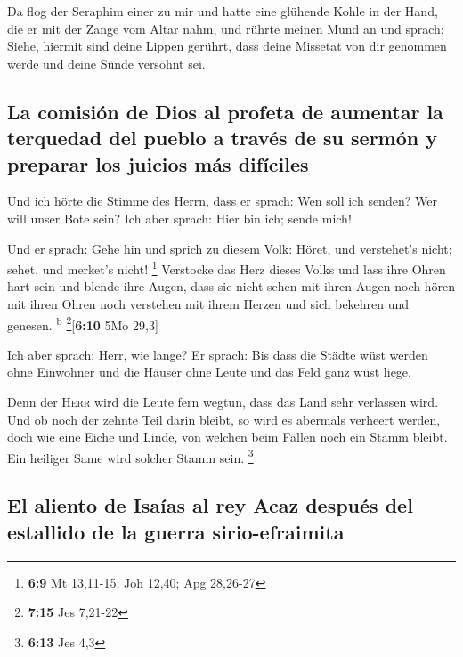  Da flog der Seraphim einer zu mir und hatte eine glühende
Kohle in der Hand, die er mit der Zange vom Altar nahm, 
und rührte meinen Mund an und sprach: Siehe, hiermit sind deine Lippen
gerührt, dass deine Missetat von dir genommen werde und deine Sünde
versöhnt sei.

\hypertarget{la-comisiuxf3n-de-dios-al-profeta-de-aumentar-la-terquedad-del-pueblo-a-travuxe9s-de-su-sermuxf3n-y-preparar-los-juicios-muxe1s-difuxedciles}{%
\subsection{La comisión de Dios al profeta de aumentar la terquedad del
pueblo a través de su sermón y preparar los juicios más
difíciles}\label{la-comisiuxf3n-de-dios-al-profeta-de-aumentar-la-terquedad-del-pueblo-a-travuxe9s-de-su-sermuxf3n-y-preparar-los-juicios-muxe1s-difuxedciles}}

 Und ich hörte die Stimme des Herrn, dass er sprach: Wen
soll ich senden? Wer will unser Bote sein? Ich aber sprach: Hier bin
ich; sende mich!

 Und er sprach: Gehe hin und sprich zu diesem Volk: Höret,
und verstehet's nicht; sehet, und merket's nicht! \footnote{\textbf{6:9}
  Mt 13,11-15; Joh 12,40; Apg 28,26-27}  Verstocke das
Herz dieses Volks und lass ihre Ohren hart sein und blende ihre Augen,
dass sie nicht sehen mit ihren Augen noch hören mit ihren Ohren noch
verstehen mit ihrem Herzen und sich bekehren und genesen.
\textsuperscript{b} \footnote{\textbf{7:15} Jes 7,21-22}{[}\textbf{6:10}
5Mo 29,3{]}

 Ich aber sprach: Herr, wie lange? Er sprach: Bis dass
die Städte wüst werden ohne Einwohner und die Häuser ohne Leute und das
Feld ganz wüst liege.

 Denn der \textsc{Herr} wird die Leute fern wegtun, dass
das Land sehr verlassen wird.  Und ob noch der zehnte
Teil darin bleibt, so wird es abermals verheert werden, doch wie eine
Eiche und Linde, von welchen beim Fällen noch ein Stamm bleibt. Ein
heiliger Same wird solcher Stamm sein. \footnote{\textbf{6:13} Jes 4,3}

\hypertarget{el-aliento-de-isauxedas-al-rey-acaz-despuuxe9s-del-estallido-de-la-guerra-sirio-efraimita}{%
\subsection{El aliento de Isaías al rey Acaz después del estallido de la
guerra
sirio-efraimita}\label{el-aliento-de-isauxedas-al-rey-acaz-despuuxe9s-del-estallido-de-la-guerra-sirio-efraimita}}

